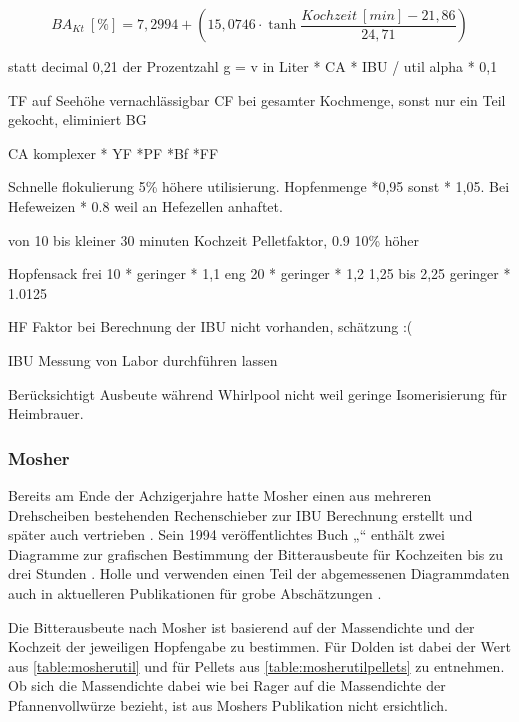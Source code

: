 \documentclass[a4paper,parskip=half]{scrartcl}
\newcommand{\BAKt}{{\mathit{BA}}_{\mathit{Kt}}}
\newcommand{\umin}{\:[\mathit{min}]}
\newcommand{\uper}{\:[\%]}
\begin{document}
\begin{equation}
\BAKt \uper = 7,2994 + \left(15,0746 \cdot \tanh{\frac{\mathit{Kochzeit} \umin - 21,86}{24,71}}\right)
\label{eq:garetzutil}
\end{equation}


statt decimal 0,21 der Prozentzahl 
g = v in Liter * CA * IBU / util  alpha * 0,1

TF auf Seehöhe vernachlässigbar
CF bei gesamter Kochmenge, sonst nur ein Teil gekocht, eliminiert BG

CA komplexer * YF *PF *Bf *FF

\parencite[140\psq]{Garetz1994} 
Schnelle flokulierung 5\% höhere utilisierung. Hopfenmenge *0,95
sonst * 1,05. Bei Hefeweizen * 0.8 weil an Hefezellen anhaftet.

von 10 bis kleiner 30 minuten Kochzeit Pelletfaktor, 0.9 10\% höher

Hopfensack
frei 10 * geringer * 1,1
eng 20 * geringer * 1,2
1,25 bis 2,25 geringer * 1.0125

HF Faktor bei Berechnung der IBU nicht vorhanden, schätzung :(

\parencite[134-144]{Garetz1994} 

IBU Messung von Labor durchführen lassen
\parencite[145]{Garetz1994} 

Berücksichtigt Ausbeute während Whirlpool nicht weil geringe
Isomerisierung für Heimbrauer.
\parencite[167]{Garetz1994} 

\subsubsection*{Mosher}

Bereits am Ende der Achzigerjahre hatte Mosher einen aus mehreren
Drehscheiben bestehenden Rechenschieber zur IBU Berechnung erstellt und später
auch vertrieben \parencite{Mosher2022}. Sein 1994 veröffentlichtes
Buch „“ enthält zwei Diagramme zur grafischen
Bestimmung der Bitterausbeute für Kochzeiten bis zu drei Stunden
\parencite[160\psq]{Mosher1994}. Holle und \citeauthor{Thesseling2019} verwenden
einen Teil der abgemessenen Diagrammdaten auch in aktuelleren Publikationen für  grobe Abschätzungen \parencites[51]{Holle2010}[9]{Thesseling2019}.

Die Bitterausbeute nach Mosher ist basierend auf der Massendichte und
der Kochzeit der jeweiligen Hopfengabe zu bestimmen. Für Dolden ist
dabei der Wert aus \autoref{table:mosherutil} und für Pellets aus
\autoref{table:mosherutilpellets} zu entnehmen. Ob sich die
Massendichte dabei wie bei Rager auf die Massendichte der Pfannenvollwürze
bezieht, ist aus Moshers Publikation nicht ersichtlich.
\end{document}
